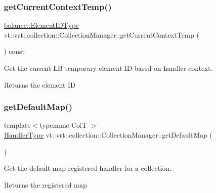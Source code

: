 \subsubsection{\texorpdfstring{get\+Current\+Context\+Temp()}{getCurrentContextTemp()}}
{\footnotesize\ttfamily \hyperlink{namespacevt_1_1vrt_1_1collection_1_1balance_a14c8d2c972f2913aa3f1636e5be0a120}{balance\+::\+Element\+I\+D\+Type} vt\+::vrt\+::collection\+::\+Collection\+Manager\+::get\+Current\+Context\+Temp (\begin{DoxyParamCaption}{ }\end{DoxyParamCaption}) const\hspace{0.3cm}{\ttfamily [private]}}



Get the current LB temporary element ID based on handler context. 

\begin{DoxyReturn}{Returns}
the element ID 
\end{DoxyReturn}
\mbox{\label{structvt_1_1vrt_1_1collection_1_1_collection_manager_aa371f1cdd4eafa9f75b7eb40a6f151e0}} 
\subsubsection{\texorpdfstring{get\+Default\+Map()}{getDefaultMap()}}
{\footnotesize\ttfamily template$<$typename ColT $>$ \\
\hyperlink{namespacevt_af64846b57dfcaf104da3ef6967917573}{Handler\+Type} vt\+::vrt\+::collection\+::\+Collection\+Manager\+::get\+Default\+Map (\begin{DoxyParamCaption}{ }\end{DoxyParamCaption})\hspace{0.3cm}{\ttfamily [static]}}



Get the default map registered handler for a collection. 

\begin{DoxyReturn}{Returns}
the registered map 
\end{DoxyReturn}
\mbox{\label{structvt_1_1vrt_1_1collection_1_1_collection_manager_ae92ad81b99b380b0b87b85f7dbda767a}} 
